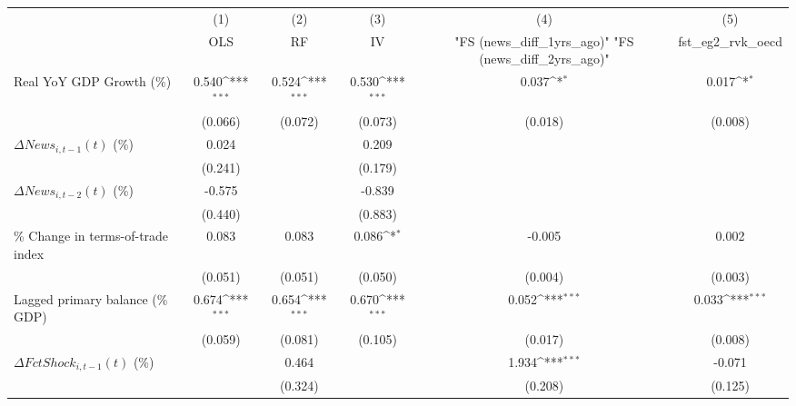 {
\def\sym#1{\ifmmode^{#1}\else\(^{#1}\)\fi}
\begin{tabular}{l*{5}{c}}
\toprule
                    &\multicolumn{1}{c}{(1)}&\multicolumn{1}{c}{(2)}&\multicolumn{1}{c}{(3)}&\multicolumn{1}{c}{(4)}&\multicolumn{1}{c}{(5)}\\
                    &\multicolumn{1}{c}{OLS}&\multicolumn{1}{c}{RF}&\multicolumn{1}{c}{IV}&\multicolumn{1}{c}{ "FS (news_diff_1yrs_ago)"  "FS (news_diff_2yrs_ago)" }&\multicolumn{1}{c}{fst_eg2_rvk_oecd}\\
\midrule
Real YoY GDP Growth (\%)&       0.540\sym{***}&       0.524\sym{***}&       0.530\sym{***}&       0.037\sym{*}  &       0.017\sym{*}  \\
                    &     (0.066)         &     (0.072)         &     (0.073)         &     (0.018)         &     (0.008)         \\
\addlinespace
$ \Delta News_{i,t-1}(t)$ (\%)&       0.024         &                     &       0.209         &                     &                     \\
                    &     (0.241)         &                     &     (0.179)         &                     &                     \\
\addlinespace
$ \Delta News_{i,t-2}(t)$ (\%)&      -0.575         &                     &      -0.839         &                     &                     \\
                    &     (0.440)         &                     &     (0.883)         &                     &                     \\
\addlinespace
\% Change in terms-of-trade index&       0.083         &       0.083         &       0.086\sym{*}  &      -0.005         &       0.002         \\
                    &     (0.051)         &     (0.051)         &     (0.050)         &     (0.004)         &     (0.003)         \\
\addlinespace
Lagged primary balance (\% GDP)&       0.674\sym{***}&       0.654\sym{***}&       0.670\sym{***}&       0.052\sym{***}&       0.033\sym{***}\\
                    &     (0.059)         &     (0.081)         &     (0.105)         &     (0.017)         &     (0.008)         \\
\addlinespace
$ \Delta FctShock_{i,t-1}(t)$ (\%)&                     &       0.464         &                     &       1.934\sym{***}&      -0.071         \\
                    &                     &     (0.324)         &                     &     (0.208)         &     (0.125)         \\

\end{tabular}}
